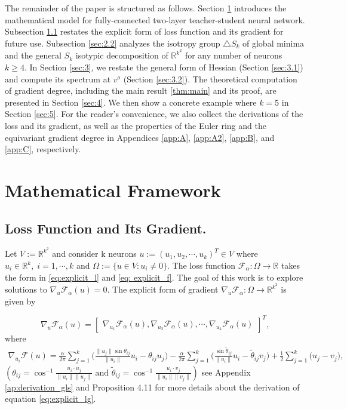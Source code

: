 \documentclass{amsart}%
\def\noi{\noindent}
\def\noi{\noindent}
\begin{document}
\noindent The remainder of the paper is structured as follows. Section \ref{sec: framework} introduces the mathematical model for fully-connected two-layer teacher-student neural network. Subsection \ref{sec：2.1} restates the explicit form of loss function and its gradient for future use. Subsection \ref{sec:2.2} analyzes the isotropy group $\triangle S_k$ of global minima and the general $S_k$ isotypic decomposition of $\mathbb R^{k^2}$ for any number of neurons $k\ge 4.$ In Section \ref{sec:3}, we restate the general form of Hessian (Section \ref{sec:3.1}) and compute its spectrum at $v^o$ (Section \ref{sec:3.2}). The theoretical computation of gradient degree, including the main result \eqref{thm:main} and its proof, are presented in Section \ref{sec:4}. We then show a concrete example where $k=5$ in Section \ref{sec:5}. For the reader’s convenience, we also collect the derivations of the loss and its gradient, as well as the properties of the Euler ring and the equivariant gradient degree in Appendices \ref{app:A}, \ref{app:A2}, \ref{app:B}, and \ref{app:C}, respectively.  \vskip0.3cm
\section{Mathematical Framework}\label{sec: framework}
\subsection{Loss Function and Its Gradient.}\label{sec：2.1}
Let $V:=\mathbb R^{k^2}$ and consider k neurons $u:=(u_1,u_2,\cdots,u_k)^T\in V$ where $u_i\in \mathbb R^k,\; i=1,\cdots,k$ 
and
$\Omega:=\{u\in V:u_{i}
\not =0\}.$
The loss function $\mathcal F_{\alpha}:\Omega\to \mathbb R$ takes the form in \eqref{eq:explicit_l} and \eqref{eq: explicit_f}. The goal of this work is to explore solutions to 
$\nabla_u \mathcal F_{\alpha}(u)=0.$
The explicit form of gradient $\nabla_u \mathcal F_{\alpha}: \Omega\to \mathbb R^{k^2}$ is given by

\begin{equation}\label{eq:lg}
\nabla_{u}\mathcal F_{\alpha}(u)=
{\begin{bmatrix}
   \nabla_{u_1}\mathcal 
 F_{\alpha}(u),\nabla_{u_2}\mathcal F_{\alpha}(u),\cdots, \nabla_{u_k}\mathcal F_{\alpha}(u) 
\end{bmatrix}}^T,
\end{equation}
where %
\begin{align}\label{eq:explicit_lg}
\nabla_{u_i}\mathcal F(u)=\frac{\alpha}{2\pi}\sum_{j=1}^{k}\Big(\frac{\|u_j\|\sin\theta_{ij}}{\|u_i\|}u_i-\theta_{ij}u_j\Big)
-\frac{\alpha}{2\pi}\sum_{j=1}^{k}\Big(\frac{\sin\tilde{\theta}_{ij}}{\|u_i\|}u_i-\tilde{\theta}_{ij}v_j\Big)+\frac{1}{2}\sum_{j=1}^k\Big(u_j-v_j\Big), 
\end{align}
$({\theta}_{ij}=\cos^{-1}\frac{u_i\cdot u_j}{\|u_i\|\|u_j\|}\text{ and } \tilde{\theta}_{ij}=\cos^{-1}\frac{u_i\cdot v_j}{\|u_i\|\|v_j\|})$\vskip0.3cm
\noi see Appendix \eqref{ap:derivation_gls} and \cite{symmetry2021} Proposition 4.11 for more details about the derivation of equation \eqref{eq:explicit_lg}.\vskip0.3cm
\end{document}
